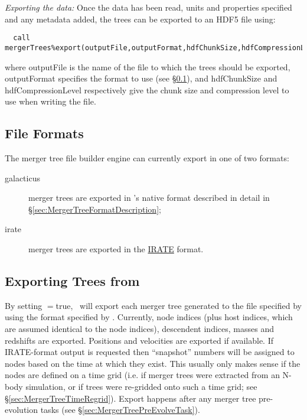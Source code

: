 \noindent \emph{Exporting the data:} Once the data has been read, units and properties specified and any metadata added, the trees can be exported to an HDF5 file using:
\begin{verbatim}
  call mergerTrees%export(outputFile,outputFormat,hdfChunkSize,hdfCompressionLevel)
\end{verbatim}
where {\normalfont \ttfamily outputFile} is the name of the file to which the trees should be exported, {\normalfont \ttfamily outputFormat} specifies the format to use (see \S\ref{sec:mergerTreeBuilderFileFormats}), and {\normalfont \ttfamily hdfChunkSize} and {\normalfont \ttfamily hdfCompressionLevel} respectively give the chunk size and compression level to use when writing the file.

\subsection{File Formats}\label{sec:mergerTreeBuilderFileFormats}

The merger tree file builder engine can currently export in one of two formats:
\begin{description}
 \item [{\normalfont \ttfamily galacticus}] merger trees are exported in \glc's native format described in detail in \S\ref{sec:MergerTreeFormatDescription};
 \item [{\normalfont \ttfamily irate}] merger trees are exported in the \href{https://bitbucket.org/eteq/irate-format}{\normalfont \ttfamily IRATE} format.
\end{description}

\subsection{Exporting Trees from \glc}

By setting {\normalfont \ttfamily [mergerTreesWrite]}$=${\normalfont \ttfamily true}, \glc\ will export each merger tree generated to the file specified by {\normalfont \ttfamily [mergerTreeExportFileName]} using the format specified by {\normalfont \ttfamily [mergerTreeExportOutputFormat]}. Currently, node indices (plus host indices, which are assumed identical to the node indices), descendent indices, masses and redshifts are exported. Positions and velocities are exported if available. If {\normalfont \ttfamily IRATE}-format output is requested then ``snapshot'' numbers will be assigned to nodes based on the time at which they exist. This usually only makes sense if the nodes are defined on a time grid (i.e. if merger trees were extracted from an N-body simulation, or if trees were re-gridded onto such a time grid; see \S\ref{sec:MergerTreeTimeRegrid}). Export happens after any merger tree pre-evolution tasks (see \S\ref{sec:MergerTreePreEvolveTask}).
